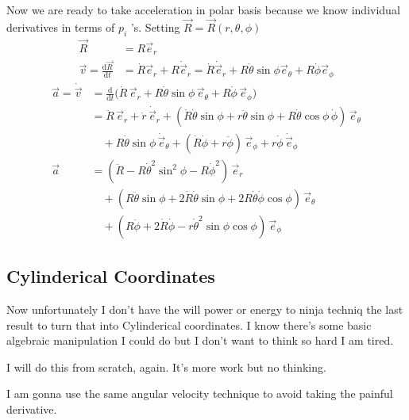\documentclass[10pts, letterpaper]{article}
\begin{document}
	     Now we are ready to take acceleration in polar basis because we know individual derivatives in terms of $p_i$ 's. Setting $\vec{R} = \vec{R}(r, \theta, \phi)$
	     \begin{align*}
		     \vec{R} &= R \vec{e}_r \\
		     \vec{v} = \frac{\mathrm{d} \vec{R}}{\mathrm{d} t} &= 
		     \dot{R} \vec{e}_r + R \dot{\vec{e}}_r = \dot{R} \dot{\vec{e}}_r + 
		     R \dot{\theta} \sin \phi \vec{e}_\theta + R \dot{\phi} \vec{e}_\phi
	     \end{align*}
	     \begin{align*}
              \vec{a} = \dot{\vec{v}} &= \frac{\mathrm{d} }{\mathrm{d} t}\Big(
              \dot{R} \,\vec{e}_r
              + R \dot\theta \sin\phi \,\vec{e}_{\theta}
              + R \dot\phi \,\vec{e}_{\phi} \Big) \\
              &= \ddot{R} \, \vec{e}_r + \dot{r} \, \dot{\vec{e}}_r
              + (\dot{R} \dot\theta \sin\phi + r \ddot\theta \sin\phi
              + R \dot\theta \cos\phi \, \dot\phi) \, \vec{e}_\theta \\
              &\quad + R \dot\theta \sin\phi \, \dot{\vec{e}}_\theta
              + (\dot{R} \dot\phi + r \ddot\phi) \, \vec{e}_\phi
              + r \dot\phi \, \dot{\vec{e}}_\phi \\ 
\vec{a} &= (\ddot{R} - R \dot{\theta}^2 \sin^2\phi
              - R \dot{\phi}^2) \,\vec{e}_r \\
              &\quad + (R \ddot\theta \sin\phi
              + 2 \dot{R} \dot\theta \sin\phi
              + 2 R \dot\theta \dot\phi \cos\phi) \,\vec{e}_{\theta} \\
              &\quad + (R \ddot\phi + 2 \dot{R} \dot\phi
              - r \dot{\theta}^2 \sin\phi \cos\phi) \,\vec{e}_{\phi}
              \end{align*}

	      \subsection*{Cylinderical Coordinates} 
	      Now unfortunately I don't have the will power or energy to ninja techniq the last result to turn that into Cylinderical coordinates. I know there's some basic algebraic manipulation I could do but I don't want to think so hard I am tired. 

	      I will do this from scratch, again. It's more work but no thinking. 

	      I am gonna use the same angular velocity technique to avoid taking the painful derivative. 
\end{document}

